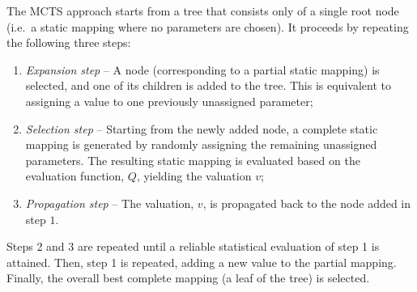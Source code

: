 \documentclass[smallextended]{svjour3}
\begin{document}
The MCTS approach starts from a tree that consists only of a
single 
root node (i.e.\ a static mapping where no
parameters are chosen). It proceeds by repeating the following three steps: 
\begin{enumerate}
\item \emph{Expansion step} -- A node (corresponding to
  a partial static mapping) is selected, and one of its children is
  added to the tree. This is equivalent to assigning a value to one previously unassigned
  parameter;
\item \emph{Selection step} -- Starting from the newly added node, a
  complete static mapping is generated by randomly assigning the
  remaining unassigned parameters. The resulting static mapping is evaluated based on the 
  evaluation function, $Q$, yielding the valuation $v$;
\item \emph{Propagation step} -- The valuation, $v$, is propagated back
  to the node added in step $1$. 
\end{enumerate}

Steps 2 and 3 are repeated until a reliable statistical evaluation of step 1 is attained. Then, step 1 is repeated, adding a new value to the partial mapping.
Finally, the overall best complete mapping (a leaf of the tree) is
selected. 



\end{document}
